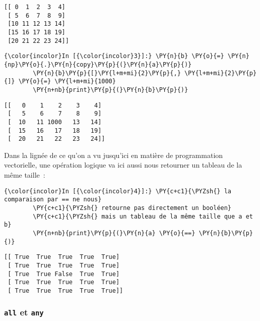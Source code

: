     \begin{Verbatim}[commandchars=\\\{\},frame=single,framerule=0.3mm,rulecolor=\color{cellframecolor}]
[[ 0  1  2  3  4]
 [ 5  6  7  8  9]
 [10 11 12 13 14]
 [15 16 17 18 19]
 [20 21 22 23 24]]
\end{Verbatim}

    \begin{Verbatim}[commandchars=\\\{\},frame=single,framerule=0.3mm,rulecolor=\color{cellframecolor}]
{\color{incolor}In [{\color{incolor}3}]:} \PY{n}{b} \PY{o}{=} \PY{n}{np}\PY{o}{.}\PY{n}{copy}\PY{p}{(}\PY{n}{a}\PY{p}{)}
        \PY{n}{b}\PY{p}{[}\PY{l+m+mi}{2}\PY{p}{,} \PY{l+m+mi}{2}\PY{p}{]} \PY{o}{=} \PY{l+m+mi}{1000}
        \PY{n+nb}{print}\PY{p}{(}\PY{n}{b}\PY{p}{)}
\end{Verbatim}


    \begin{Verbatim}[commandchars=\\\{\},frame=single,framerule=0.3mm,rulecolor=\color{cellframecolor}]
[[   0    1    2    3    4]
 [   5    6    7    8    9]
 [  10   11 1000   13   14]
 [  15   16   17   18   19]
 [  20   21   22   23   24]]
\end{Verbatim}

    Dans la lignée de ce qu'on a vu jusqu'ici en matière de programmation
vectorielle, une opération logique va ici aussi nous retourner un
tableau de la même taille~:

    \begin{Verbatim}[commandchars=\\\{\},frame=single,framerule=0.3mm,rulecolor=\color{cellframecolor}]
{\color{incolor}In [{\color{incolor}4}]:} \PY{c+c1}{\PYZsh{} la comparaison par == ne nous}
        \PY{c+c1}{\PYZsh{} retourne pas directement un booléen}
        \PY{c+c1}{\PYZsh{} mais un tableau de la même taille que a et b}
        \PY{n+nb}{print}\PY{p}{(}\PY{n}{a} \PY{o}{==} \PY{n}{b}\PY{p}{)}
\end{Verbatim}


    \begin{Verbatim}[commandchars=\\\{\},frame=single,framerule=0.3mm,rulecolor=\color{cellframecolor}]
[[ True  True  True  True  True]
 [ True  True  True  True  True]
 [ True  True False  True  True]
 [ True  True  True  True  True]
 [ True  True  True  True  True]]
\end{Verbatim}

    \hypertarget{all-et-any}{%
\subsubsection{\texorpdfstring{\texttt{all} et
\texttt{any}}{all et any}}\label{all-et-any}}

